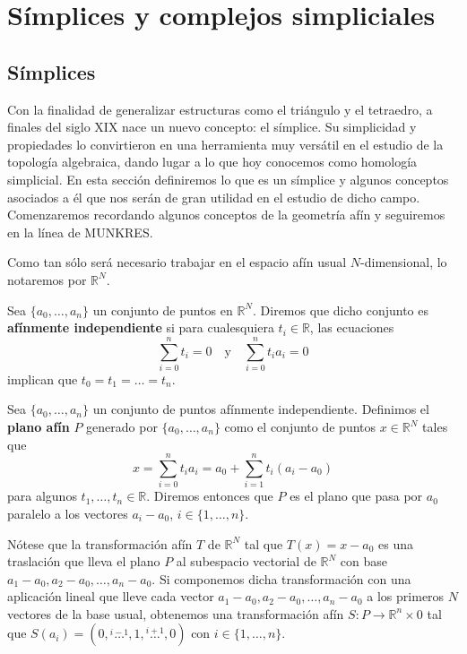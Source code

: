 
\chapter{Símplices y complejos simpliciales}

\section{Símplices}

Con la finalidad de generalizar estructuras como el triángulo y el tetraedro, 
a finales del siglo XIX nace un nuevo concepto: el símplice. Su simplicidad y 
propiedades lo convirtieron en una herramienta muy versátil en el estudio de la
topología algebraica, dando lugar a lo que hoy conocemos como homología simplicial. 
En esta sección definiremos lo que es un símplice y algunos conceptos asociados a él
que nos serán de gran utilidad en el estudio de dicho campo. Comenzaremos recordando algunos conceptos de la geometría afín y seguiremos en la línea de MUNKRES.

Como tan sólo será necesario trabajar en el espacio afín usual $N$-dimensional, lo notaremos por $\mathbb{R}^{N}$.

\begin{definicion}
	Sea $\{a_0, \dots, a_n\}$ un conjunto de puntos en $\mathbb{R}^N$. 
	Diremos que dicho conjunto es \textbf{afínmente independiente} si 
	para cualesquiera $t_i \in \mathbb{R}$, las ecuaciones
	\[ \sum_{i=0}^{n}t_i=0 \quad \text{y} \quad \sum_{i=0}^{n}t_ia_i=0 \]
	implican que $t_0 = t_1 = \dots = t_n$.
\end{definicion}

\begin{definicion}
	Sea $\{a_0, \dots, a_n\}$ un conjunto de puntos afínmente independiente. 
	Definimos el \textbf{plano afín} $P$ generado por $\{a_0, \dots, a_n\}$ como
	el conjunto de puntos $x \in \mathbb{R}^N$ tales que
	\[ x = \sum_{i=0}^{n}t_ia_i = a_0 + \sum_{i=1}^{n}t_i(a_i - a_0) \]
	para algunos $t_1, \dots, t_n \in \mathbb{R}$. Diremos entonces que $P$ es el 
	plano que pasa por $a_0$ paralelo a los vectores $a_i - a_0$, $i \in \{1, \dots, n\}$.
\end{definicion}

Nótese que la transformación afín $T$ de $\mathbb{R}^N$ tal que $T(x) = x - a_0$ es una traslación que lleva el plano $P$ al subespacio vectorial de $\mathbb{R}^N$ con base $a_1-a_0, a_2-a_0, \dots, a_n-a_0$. Si componemos dicha transformación con una aplicación lineal que lleve cada vector $a_1-a_0, a_2-a_0, \dots, a_n-a_0$ a los primeros $N$ vectores de la base usual, obtenemos una transformación afín $S: P \rightarrow \mathbb{R}^n \times 0$ tal que $S(a_i) = (0, \overset{i-1}{\dots}, 1, \overset{i+1}{\dots}, 0)$ con $i \in \{1, \dots, n\}$.

